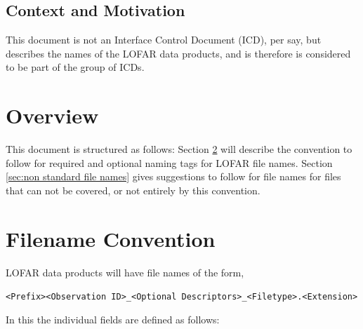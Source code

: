 \documentclass[a4paper,10pt,bibtotoc]{scrartcl}
\begin{document}
\subsection{Context and Motivation}

This document is not an Interface Control Document (ICD), per say, but
describes the names of the LOFAR data products, and is therefore is
considered to be part of the group of ICDs.




\section{Overview}
\label{sec:overview}

This document is structured as follows: Section \ref{sec:filename convention} 
will describe the convention to follow for required and optional naming tags 
for LOFAR file names. Section \ref{sec:non standard file names} gives suggestions to follow for file names for files that can not be covered, or not entirely by this convention.


\section{Filename Convention}
\label{sec:filename convention}

LOFAR data products \cite{lofar.icd.001,lofar.icd.003,lofar.icd.004,lofar.icd.006,lofar.icd.007,lofar.icd.008} will have file names of the form,

\begin{center}
  \verb|<Prefix><Observation ID>_<Optional Descriptors>_<Filetype>.<Extension>|
\end{center}

In this the individual fields are defined as follows:
\end{document}
